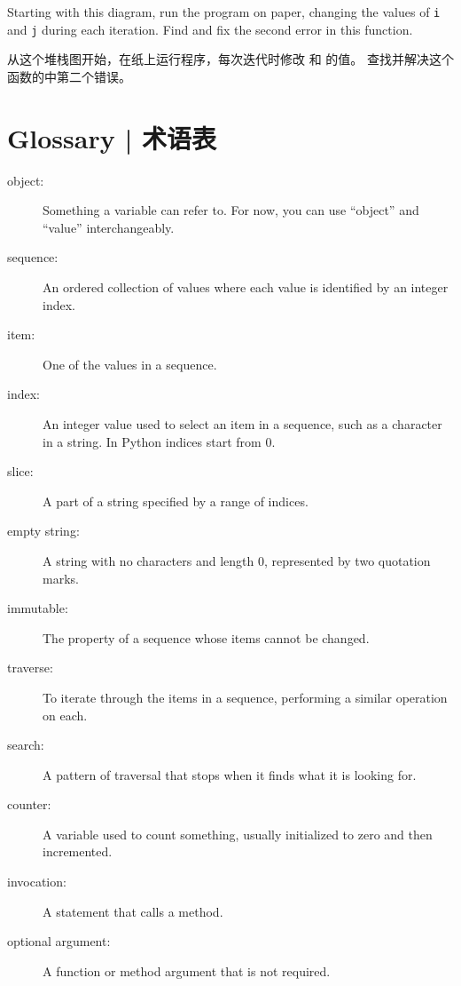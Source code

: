 Starting with this diagram, run the program on paper, changing the
values of {\tt i} and {\tt j} during each iteration.  Find and fix the
second error in this function.

从这个堆栈图开始，在纸上运行程序，每次迭代时修改  和  的值。 查找并解决这个函数的中第二个错误。
\label{isreverse}


\section{Glossary  |  术语表}

\begin{description}

\item[object:] Something a variable can refer to.  For now,
you can use ``object'' and ``value'' interchangeably.

\item[sequence:] An ordered collection of
values where each value is identified by an integer index.

\item[item:] One of the values in a sequence.

\item[index:] An integer value used to select an item in
a sequence, such as a character in a string.  In Python
indices start from 0.

\item[slice:] A part of a string specified by a range of indices.

\item[empty string:] A string with no characters and length 0, represented
by two quotation marks.

\item[immutable:] The property of a sequence whose items cannot
be changed.

\item[traverse:] To iterate through the items in a sequence,
performing a similar operation on each.

\item[search:] A pattern of traversal that stops
when it finds what it is looking for.

\item[counter:] A variable used to count something, usually initialized
to zero and then incremented.

\item[invocation:] A statement that calls a method.

\item[optional argument:] A function or method argument that is not
required.

\end{description}

